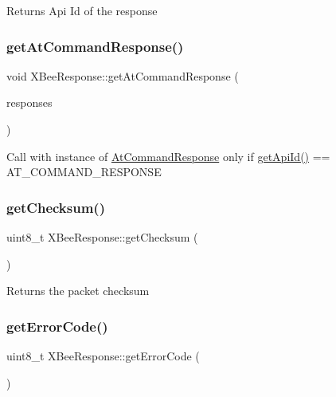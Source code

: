 Returns Api Id of the response \hypertarget{class_x_bee_response_a5177bb036ccaa6ea30d73541a3e7d414}{}\label{class_x_bee_response_a5177bb036ccaa6ea30d73541a3e7d414} 
\subsubsection{\texorpdfstring{get\+At\+Command\+Response()}{getAtCommandResponse()}}
{\footnotesize\ttfamily void X\+Bee\+Response\+::get\+At\+Command\+Response (\begin{DoxyParamCaption}\item[{\hyperlink{class_x_bee_response}{X\+Bee\+Response} \&}]{responses }\end{DoxyParamCaption})}

Call with instance of \hyperlink{class_at_command_response}{At\+Command\+Response} only if \hyperlink{class_x_bee_response_a4a9677e3b39054119fa278d1ad52130a}{get\+Api\+Id()} == A\+T\+\_\+\+C\+O\+M\+M\+A\+N\+D\+\_\+\+R\+E\+S\+P\+O\+N\+SE \hypertarget{class_x_bee_response_aa8f34253bb77196366ea8ac9bc318734}{}\label{class_x_bee_response_aa8f34253bb77196366ea8ac9bc318734} 
\subsubsection{\texorpdfstring{get\+Checksum()}{getChecksum()}}
{\footnotesize\ttfamily uint8\+\_\+t X\+Bee\+Response\+::get\+Checksum (\begin{DoxyParamCaption}{ }\end{DoxyParamCaption})}

Returns the packet checksum \hypertarget{class_x_bee_response_a2895438378d2738e3efe74b1c838170b}{}\label{class_x_bee_response_a2895438378d2738e3efe74b1c838170b} 
\subsubsection{\texorpdfstring{get\+Error\+Code()}{getErrorCode()}}
{\footnotesize\ttfamily uint8\+\_\+t X\+Bee\+Response\+::get\+Error\+Code (\begin{DoxyParamCaption}{ }\end{DoxyParamCaption})}

